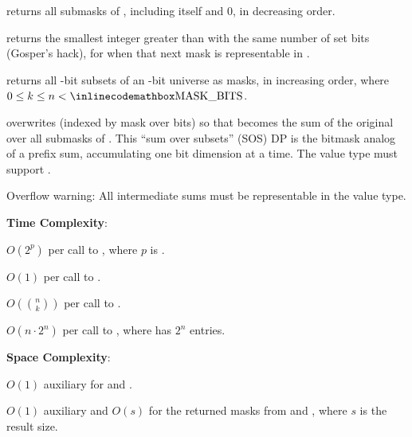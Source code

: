 \begin{compactitem}
  \item {} returns all submasks of , including  itself and 0, in decreasing order.
  \item {} returns the smallest integer greater than  with the same number of set bits (Gosper's hack), for  when that next mask is representable in .
  \item {} returns all -bit subsets of an -bit universe as masks, in increasing order, where $0 \leq k \leq n < {\inlinecodemath{MASK\_BITS}}$.
  \item {} overwrites  (indexed by mask over  bits) so that  becomes the sum of the original  over all submasks  of . This ``sum over subsets'' (SOS) DP is the bitmask analog of a prefix sum, accumulating one bit dimension at a time. The value type must support \inlinecode{+=}.
\end{compactitem}

Overflow warning: All intermediate sums must be representable in the value type.

\textbf{Time Complexity}:
\begin{compactitem}
  \item $O(2^{p})$ per call to , where $p$ is .
  \item $O(1)$ per call to .
  \item $O(\binom{n}{k})$ per call to .
  \item $O(n \cdot 2^{n})$ per call to , where  has $2^n$ entries.
\end{compactitem}

\textbf{Space Complexity}:
\begin{compactitem}
  \item $O(1)$ auxiliary for  and .
  \item $O(1)$ auxiliary and $O(s)$ for the returned masks from  and , where $s$ is the result size.
\end{compactitem}

